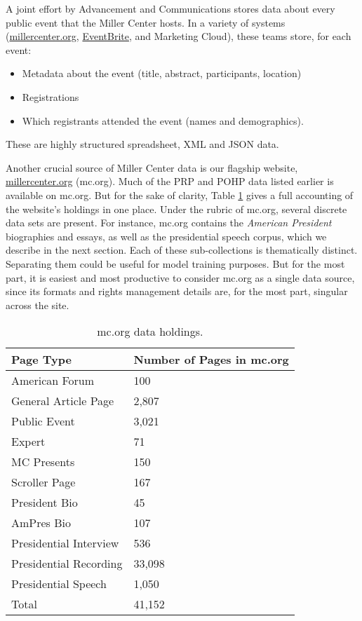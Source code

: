 \documentclass[12pt, oneside]{article}   	%
\begin{document}
A joint effort by Advancement and Communications stores data about every public event that the Miller Center hosts.  In a variety of systems (\href{https://millercenter.org}{millercenter.org}, \href{eventbrite.com}{EventBrite}, and Marketing Cloud), these teams store, for each event:
\begin{itemize}
\item Metadata about the event (title, abstract, participants, location)
\item Registrations
\item Which registrants attended the event (names and demographics).
\end{itemize}
These  are highly structured spreadsheet, XML and JSON data.  

Another crucial source of Miller Center data is our flagship website, \href{https://millercenter.org}{millercenter.org} (mc.org).  Much of the PRP and POHP data listed earlier is available on mc.org.  But for the sake of clarity, Table \ref{table.data.mcorg} gives a full accounting of the website's holdings in one place.  Under the rubric of mc.org, several discrete data sets are present.  For instance, mc.org contains the \emph{American President} biographies and essays, as well as the presidential speech corpus, which we describe in the next section.  Each of these sub-collections is thematically distinct.  Separating them could be useful for model training purposes.  But for the most part, it is easiest and most productive to consider mc.org as a single data source, since its formats and rights management details are, for the most part, singular across the site.


\begin{table}[htp]
\caption{mc.org data holdings.}
\begin{center}
\begin{tabular}{ p{1.75in} p{2in}}
\toprule
Page Type				&	Number of Pages in mc.org		\\
\midrule
American Forum			&	100		\\
\midrule
General Article Page			&	2,807	\\
\midrule
Public Event				&	3,021	\\
\midrule
Expert					&	71		\\
\midrule
MC Presents				&	150		\\
\midrule
Scroller Page				&	167		\\
\midrule
President Bio				&	45		\\
\midrule
AmPres Bio				&	107		\\
\midrule
Presidential Interview		&	536		\\
\midrule
Presidential Recording		&	33,098	\\
\midrule
Presidential Speech			&	1,050	\\
\bottomrule		
Total						& 	41,152	\\
\bottomrule
\end{tabular}
\end{center}
\label{table.data.mcorg}
\end{table}%
\end{document}

